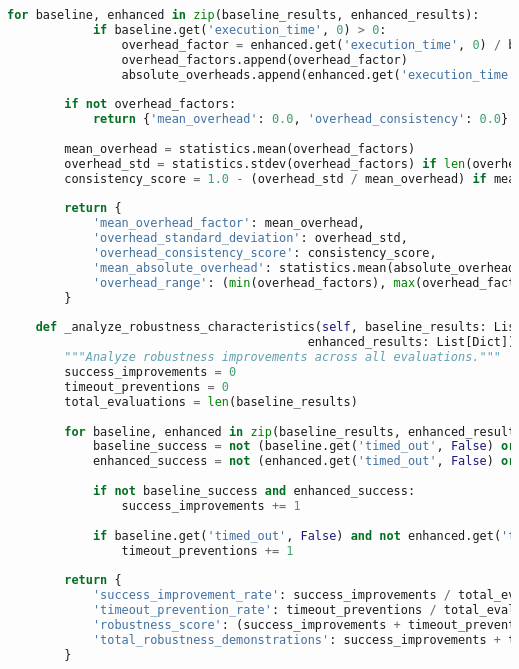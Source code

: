 \begin{lstlisting}[language=Python, caption=Multi-dimensional Trade-off Analysis and Characterisation]
        for baseline, enhanced in zip(baseline_results, enhanced_results):
            if baseline.get('execution_time', 0) > 0:
                overhead_factor = enhanced.get('execution_time', 0) / baseline['execution_time']
                overhead_factors.append(overhead_factor)
                absolute_overheads.append(enhanced.get('execution_time', 0) - baseline['execution_time'])
        
        if not overhead_factors:
            return {'mean_overhead': 0.0, 'overhead_consistency': 0.0}
        
        mean_overhead = statistics.mean(overhead_factors)
        overhead_std = statistics.stdev(overhead_factors) if len(overhead_factors) > 1 else 0.0
        consistency_score = 1.0 - (overhead_std / mean_overhead) if mean_overhead > 0 else 0.0
        
        return {
            'mean_overhead_factor': mean_overhead,
            'overhead_standard_deviation': overhead_std,
            'overhead_consistency_score': consistency_score,
            'mean_absolute_overhead': statistics.mean(absolute_overheads) if absolute_overheads else 0.0,
            'overhead_range': (min(overhead_factors), max(overhead_factors)) if overhead_factors else (0.0, 0.0)
        }
    
    def _analyze_robustness_characteristics(self, baseline_results: List[Dict], 
                                          enhanced_results: List[Dict]) -> Dict:
        """Analyze robustness improvements across all evaluations."""
        success_improvements = 0
        timeout_preventions = 0
        total_evaluations = len(baseline_results)
        
        for baseline, enhanced in zip(baseline_results, enhanced_results):
            baseline_success = not (baseline.get('timed_out', False) or baseline.get('satisfiable') is None)
            enhanced_success = not (enhanced.get('timed_out', False) or enhanced.get('satisfiable') is None)
            
            if not baseline_success and enhanced_success:
                success_improvements += 1
            
            if baseline.get('timed_out', False) and not enhanced.get('timed_out', False):
                timeout_preventions += 1
        
        return {
            'success_improvement_rate': success_improvements / total_evaluations,
            'timeout_prevention_rate': timeout_preventions / total_evaluations,
            'robustness_score': (success_improvements + timeout_preventions) / total_evaluations,
            'total_robustness_demonstrations': success_improvements + timeout_preventions
        }
    

\end{lstlisting}
